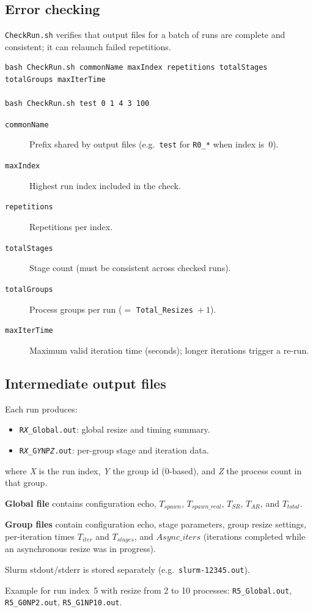 \subsection{Error checking}

\texttt{CheckRun.sh} verifies that output files for a batch of runs are complete and consistent; it can relaunch failed repetitions.

\begin{lstlisting}[style=bashstyle,caption={CheckRun.sh usage.},captionpos=b,label=code:Checkrun-usage]
bash CheckRun.sh commonName maxIndex repetitions totalStages totalGroups maxIterTime

bash CheckRun.sh test 0 1 4 3 100
\end{lstlisting}

\begin{description}
  \item[\texttt{commonName}] Prefix shared by output files (e.g.\ \texttt{test} for \texttt{R0\_*} when index is~0).
  \item[\texttt{maxIndex}] Highest run index included in the check.
  \item[\texttt{repetitions}] Repetitions per index.
  \item[\texttt{totalStages}] Stage count (must be consistent across checked runs).
  \item[\texttt{totalGroups}] Process groups per run ($=$ \texttt{Total\_Resizes}~$+~1$).
  \item[\texttt{maxIterTime}] Maximum valid iteration time (seconds); longer iterations trigger a re-run.
\end{description}

\subsection{Intermediate output files}
\label{subsection:intermediate_files}

Each run produces:

\begin{itemize}
  \item \texttt{R\textit{X}\_Global.out}: global resize and timing summary.
  \item \texttt{R\textit{X}\_G\textit{Y}NP\textit{Z}.out}: per-group stage and iteration data.
\end{itemize}

where \textit{X} is the run index, \textit{Y} the group id (0-based), and \textit{Z} the process count in that group.

\textbf{Global file} contains configuration echo, $T_{spawn}$, $T_{spawn\_real}$, $T_{SR}$, $T_{AR}$, and $T_{total}$.

\textbf{Group files} contain configuration echo, stage parameters, group resize settings, per-iteration times $T_{iter}$ and $T_{stages}$, and $Async\_iters$ (iterations completed while an asynchronous resize was in progress).

Slurm stdout/stderr is stored separately (e.g.\ \texttt{slurm-12345.out}).

Example for run index~5 with resize from 2 to 10 processes: \texttt{R5\_Global.out}, \texttt{R5\_G0NP2.out}, \texttt{R5\_G1NP10.out}.
